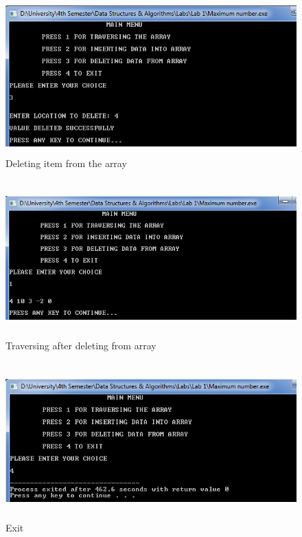 \documentclass[11pt]{article}            %
\begin{document}
\begin{figure}[H]
\centering
  \includegraphics[width=12cm,height=6cm,keepaspectratio]{6.png}
\caption{Deleting item from the array}
\label{Figure:6}    
\end{figure}

\begin{figure}[H]
\centering
  \includegraphics[width=12cm,height=6cm,keepaspectratio]{7.png}
\caption{Traversing after deleting from array}
\label{Figure:7}    
\end{figure}

\begin{figure}[H]
\centering
  \includegraphics[width=12cm,height=6cm,keepaspectratio]{8.png}
\caption{Exit}
\label{Figure:8}    
\end{figure}
\end{document}
